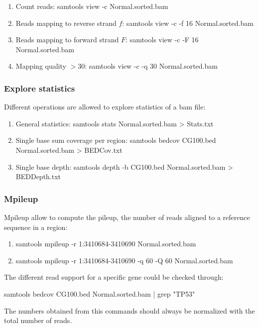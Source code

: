 		\begin{enumerate}
			\item Count reads: samtools view -c Normal.sorted.bam
			\item Reads mapping to reverse strand $f$: samtools view -c -f 16 Normal.sorted.bam
			\item Reads mapping to forward strand $F$: samtools view -c -F 16 Normal.sorted.bam
			\item Mapping quality $>30$: samtools view -c -q $30$ Normal.sorted.bam
		\end{enumerate}

		\subsubsection{Explore statistics}
		Different operations are allowed to explore statistics of a bam file:

		\begin{enumerate}
			\item General statistics: samtools stats Normal.sorted.bam > Stats.txt
			\item Single base sum coverage per region: samtools bedcov CG100.bed Normal.sorted.bam > BEDCov.txt
			\item Single base depth: samtools depth -b CG100.bed Normal.sorted.bam > BEDDepth.txt
		\end{enumerate}

		\subsubsection{Mpileup}
		Mpileup allow to compute the pileup, the number of reads aligned to a reference sequence in a region:

		\begin{enumerate}
			\item samtools mpileup -r 1:3410684-3410690 Normal.sorted.bam
			\item samtools mpileup -r 1:3410684-3410690 -q 60 -Q 60 Normal.sorted.bam
		\end{enumerate}

		The different read support for a specific gene could be checked through:

		\begin{center}
			samtools bedcov CG100.bed Normal.sorted.bam | grep "TP53"
		\end{center}

		The numbers obtained from this commands should always be normalized with the total number of reads.
